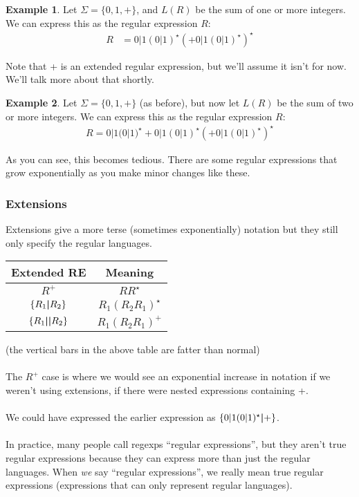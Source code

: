 \documentclass[]{article}
\theoremstyle{definition}
\newtheorem{ex}{Example}[section]
\begin{document}
			\begin{ex}
				Let $\Sigma = \{ 0, 1, + \}$, and $L(R)$ be the sum of one or more integers. We can express this as the regular expression $R$:
				\begin{align*}
					R &= 0 | 1 (0 | 1)^\star{} (+ 0|1(0|1)^\star{})^\star
				\end{align*}

				Note that + is an extended regular expression, but we'll assume it isn't for now. We'll talk more about that shortly.
			\end{ex}

			\begin{ex}
				Let $\Sigma = \{ 0, 1, + \}$ (as before), but now let $L(R)$ be the sum of two or more integers. We can express this as the regular expression $R$:
				\begin{align*}
					R = 0|1(0|1)^\star{} + 0|1(0|1)^\star{} (+ 0|1(0|1)^\star{})^\star
				\end{align*}

				As you can see, this becomes tedious. There are some regular expressions that grow exponentially as you make minor changes like these.
			\end{ex}

			\subsubsection{Extensions}
				Extensions give a more terse (sometimes exponentially) notation but they still only specify the regular languages.
				
				\begin{center}
					\begin{tabular}{c|c}
						Extended RE & Meaning \\ \hline
						$R^+$ & $RR^\star$ \\
						$\{R_1 \text{\textbf{|}} R_2\}$ & $R_1(R_2R_1)^\star$ \\
						$\{R_1 \text{\textbf{||}} R_2\}$ & $R_1(R_2R_1)^+$
					\end{tabular}
				\end{center}
				(the vertical bars in the above table are fatter than normal)
				\\ \\
				The $R^+$ case is where we would see an exponential increase in notation if we weren't using extensions, if there were nested expressions containing +.
				\\ \\
				We could have expressed the earlier expression as $\{0|1(0|1)^\star{} \text{\textbf{|}} +\}$.
				\\ \\
				In practice, many people call regexps ``regular expressions'', but they aren't true regular expressions because they can express more than just the regular languages. When \emph{we} say ``regular expressions'', we really mean true regular expressions (expressions that can only represent regular languages).
			
\end{document}
